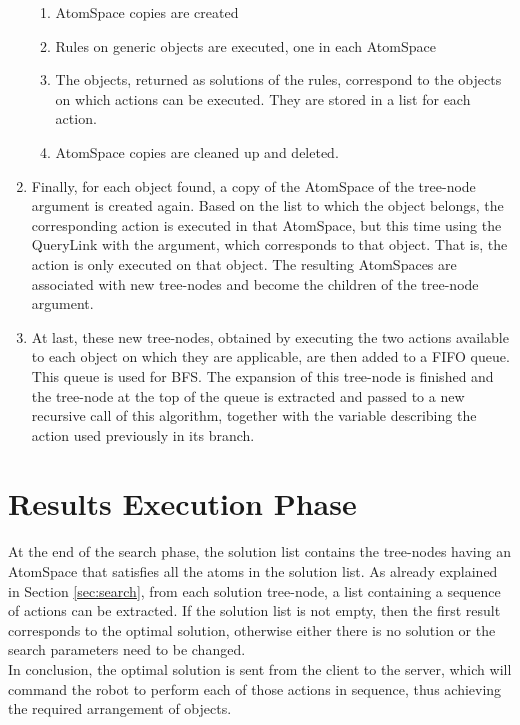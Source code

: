 \begin{enumerate}
	\begin{enumerate}
		\item AtomSpace copies are created
		\item Rules on generic objects are executed, one in each AtomSpace
		\item The objects, returned as solutions of the rules, correspond to the objects on which actions can be executed. They are stored in a list for each action.
		\item AtomSpace copies are cleaned up and deleted.
	\end{enumerate}

	\item Finally, for each object found, a copy of the AtomSpace of the tree-node argument is created again. Based on the list to which the object belongs, the corresponding action is executed in that AtomSpace, but this time using the QueryLink with the argument, which corresponds to that object. That is, the action is only executed on that object. 
The resulting AtomSpaces are associated with new tree-nodes and become the children of the tree-node argument.
	
	\item At last, these new tree-nodes, obtained by executing the two actions available to each object on which they are applicable, are then added to a FIFO queue.
This queue is used for BFS. 
The expansion of this tree-node is finished and the tree-node at the top of the queue is extracted and passed to a new recursive call of this algorithm, together with the variable describing the action used previously in its branch. 
\end{enumerate}


\section{Results Execution Phase}\label{sec:results_exec}

At the end of the search phase, the solution list contains the tree-nodes having an AtomSpace that satisfies all the atoms in the solution list.
As already explained in Section \ref{sec:search}, from each solution tree-node, a list containing a sequence of actions can be extracted.
If the solution list is not empty, then the first result corresponds to the optimal solution, otherwise either there is no solution or the search parameters need to be changed. \\
In conclusion, the optimal solution is sent from the client to the server, which will command the robot to perform each of those actions in sequence, thus achieving the required arrangement of objects.

